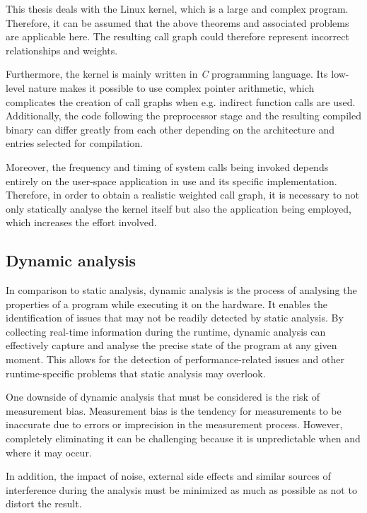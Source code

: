 This thesis deals with the Linux kernel, which is a large and complex program. Therefore, it can be assumed that the above theorems and associated problems are applicable here. The resulting call graph could therefore represent incorrect relationships and weights.

Furthermore, the kernel is mainly written in \textit{C} programming language. Its low-level nature makes it possible to use complex pointer arithmetic, which complicates the creation of call graphs when e.g. indirect function calls are used. Additionally, the code following the preprocessor stage and the resulting compiled binary can differ greatly from each other depending on the architecture and entries selected for compilation. 

Moreover, the frequency and timing of system calls being invoked depends entirely on the user-space application in use and its specific implementation. Therefore, in order to obtain a realistic weighted call graph, it is necessary to not only statically analyse the kernel itself but also the application being employed, which increases the effort involved.

\vspace{-\baselineskip}
\subsection{Dynamic analysis}

In comparison to static analysis, dynamic analysis is the process of analysing the properties of a program while executing it on the hardware. \cite[p. 2]{binanal} It enables the identification of issues that may not be readily detected by static analysis. By collecting real-time information during the runtime, dynamic analysis can effectively capture and analyse the precise state of the program at any given moment. This allows for the detection of performance-related issues and other runtime-specific problems that static analysis may overlook. \cite{concept-dynamic}

\enlargethispage{3\baselineskip}
One downside of dynamic analysis that must be considered is the risk of measurement bias. Measurement bias is the tendency for measurements to be inaccurate due to errors or imprecision in the measurement process. However, completely eliminating it can be challenging because it is unpredictable when and where it may occur. \cite[p. 17-19]{patmc} \cite{wrong-data}

In addition, the impact of noise, external side effects and similar sources of interference during the analysis must be minimized as much as possible as not to distort the result. \cite[p. 69]{patmc}

